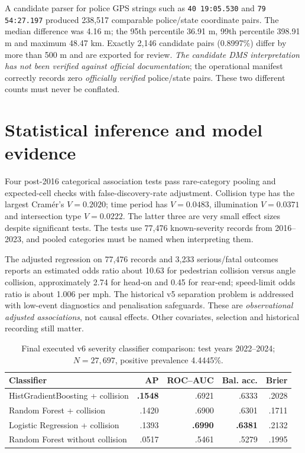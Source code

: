 \documentclass[11pt,a4paper,openany]{report}
\begin{document}
A candidate parser for police GPS strings such as \texttt{40 19:05.530} and \texttt{79 54:27.197} produced 238,517 comparable police/state coordinate pairs. The median difference was 4.16 m; the 95th percentile 36.91 m, 99th percentile 398.91 m and maximum 48.47 km. Exactly 2,146 candidate pairs (0.8997\%) differ by more than 500 m and are exported for review. \emph{The candidate DMS interpretation has not been verified against official documentation}; the operational manifest correctly records zero \emph{officially verified} police/state pairs. These two different counts must never be conflated.

\section{Statistical inference and model evidence}
Four post-2016 categorical association tests pass rare-category pooling and expected-cell checks with false-discovery-rate adjustment. Collision type has the largest Cram\'er's $V=0.2020$; time period has $V=0.0483$, illumination $V=0.0371$ and intersection type $V=0.0222$. The latter three are very small effect sizes despite significant tests. The tests use 77,476 known-severity records from 2016--2023, and pooled categories must be named when interpreting them.

The adjusted regression on 77,476 records and 3,233 serious/fatal outcomes reports an estimated odds ratio about 10.63 for pedestrian collision versus angle collision, approximately 2.74 for head-on and 0.45 for rear-end; speed-limit odds ratio is about 1.006 per mph. The historical v5 separation problem is addressed with low-event diagnostics and penalisation safeguards. These are \emph{observational adjusted associations}, not causal effects. Other covariates, selection and historical recording still matter.

\begin{table}[htbp]\centering\small
\caption{Final executed v6 severity classifier comparison: test years 2022--2024; $N=27{,}697$, positive prevalence 4.4445\%.}
\begin{tabular}{@{}L{54mm}rrrr@{}}\toprule
Classifier & AP & ROC--AUC & Bal. acc. & Brier\\\midrule
HistGradientBoosting + collision & \textbf{.1548} & .6921 & .6333 & .2028\\
Random Forest + collision & .1420 & .6900 & .6301 & .1711\\
Logistic Regression + collision & .1393 & \textbf{.6990} & \textbf{.6381} & .2132\\
Random Forest without collision & .0517 & .5461 & .5279 & .1995\\\bottomrule
\end{tabular}
\end{table}
\end{document}
